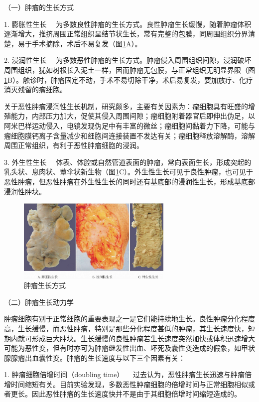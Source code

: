 {（一）肿瘤的生长方式}

{1. 膨胀性生长}
　为多数良性肿瘤的生长方式。良性肿瘤生长缓慢，随着肿瘤体积逐渐增大，推挤周围正常组织呈结节状生长，常有完整的包膜，同周围组织分界清楚，易于手术摘除，术后不易复发（图\ref{fig5-5}A）。

{2. 浸润性生长}
　为多数恶性肿瘤的生长方式。肿瘤侵入周围组织间隙，浸润破坏周围组织，犹如树根长入泥土一样，因而肿瘤无包膜，与正常组织无明显界限（图\ref{fig5-5}B）。触诊时，肿瘤固定不动，手术不易切除干净，术后易复发，要加放疗、化疗消灭残留的瘤细胞。

关于恶性肿瘤浸润性生长机制，研究颇多，主要有关因素为：瘤细胞具有旺盛的增殖能力，内部压力加大，促使其侵入周围间隙；瘤细胞附着器官后即伸出伪足，以阿米巴样运动侵入，电镜发现伪足中有丰富的微丝；瘤细胞间黏着力下降，可能与瘤细胞膜钙离子含量减少和细胞间连接装置不发达有关；瘤细胞释放溶解酶，溶解周围正常组织，有利于恶性肿瘤细胞的浸润。

{3. 外生性生长}
　体表、体腔或自然管道表面的肿瘤，常向表面生长，形成突起的乳头状、息肉状、蕈伞状新生物（图\ref{fig5-5}C）。外生性生长可见于良性肿瘤，也可见于恶性肿瘤，但恶性肿瘤在外生性生长的同时还有基底部的浸润性生长，形成基底部浸润性肿块。

\begin{figure}[!htbp]
 \centering
 \includegraphics[width=0.66\textwidth]{./images/Image00072.jpg}
 \caption{肿瘤生长方式}
 \label{fig5-5}
  \end{figure}

{（二）肿瘤生长动力学}

肿瘤细胞有别于正常细胞的重要表现之一是它们能持续地生长。良性肿瘤分化程度高，生长缓慢，而恶性肿瘤，特别是那些分化程度甚低的肿瘤，其生长速度快，短期内就可形成巨大肿块。生长缓慢的良性肿瘤若生长速度突然加快或体积迅速增大可能为恶性变，但有时亦可为肿瘤继发性出血、坏死及囊性变造成的假象，如甲状腺腺瘤出血囊性变。肿瘤的生长速度与以下三个因素有关：

{1. 肿瘤细胞倍增时间（doubling time）}
　过去认为，恶性肿瘤生长迅速与肿瘤倍增时间缩短有关。目前实验发现，多数恶性肿瘤细胞的倍增时间与正常细胞相似或者更长。因此恶性肿瘤的生长速度快并不是由于其细胞倍增时间缩短造成的。

